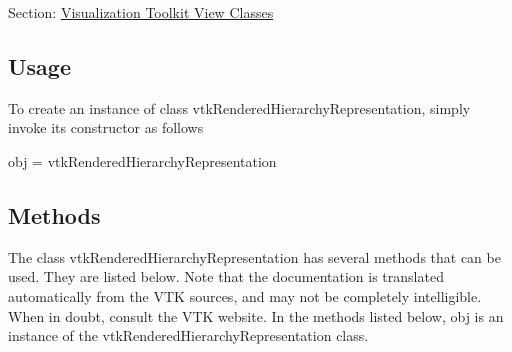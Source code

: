 Section\-: \hyperlink{sec_vtkviews}{Visualization Toolkit View Classes} \hypertarget{vtkwidgets_vtkxyplotwidget_Usage}{}\subsection{Usage}\label{vtkwidgets_vtkxyplotwidget_Usage}
To create an instance of class vtk\-Rendered\-Hierarchy\-Representation, simply invoke its constructor as follows \begin{DoxyVerb}  obj = vtkRenderedHierarchyRepresentation
\end{DoxyVerb}
 \hypertarget{vtkwidgets_vtkxyplotwidget_Methods}{}\subsection{Methods}\label{vtkwidgets_vtkxyplotwidget_Methods}
The class vtk\-Rendered\-Hierarchy\-Representation has several methods that can be used. They are listed below. Note that the documentation is translated automatically from the V\-T\-K sources, and may not be completely intelligible. When in doubt, consult the V\-T\-K website. In the methods listed below, {\ttfamily obj} is an instance of the vtk\-Rendered\-Hierarchy\-Representation class. 
